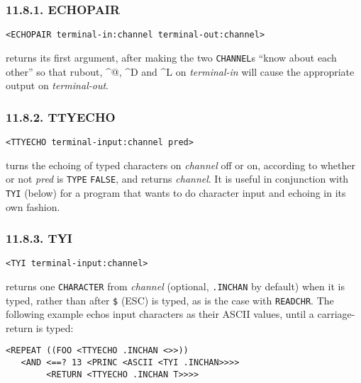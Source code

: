 \documentclass[a4paper,]{article}
\begin{document}
\subsubsection{11.8.1. ECHOPAIR}\label{echopair}

\begin{verbatim}
<ECHOPAIR terminal-in:channel terminal-out:channel>
\end{verbatim}

 returns its first argument, after making the two \texttt{CHANNEL}s ``know about each
other'' so that rubout, \^{}@,  \^{}D  and \^{}L
 on \emph{terminal-in} will cause the appropriate output on \emph{terminal-out}.

\subsubsection{11.8.2. TTYECHO}\label{ttyecho}

\begin{verbatim}
<TTYECHO terminal-input:channel pred>
\end{verbatim}

 turns the echoing of typed characters on \emph{channel} off or on, according to whether or
not \emph{pred} is \texttt{TYPE} \texttt{FALSE}, and returns \emph{channel}. It is useful in conjunction with \texttt{TYI}
(below) for a program that wants to do character input and echoing in its own fashion.

\subsubsection{11.8.3. TYI}\label{tyi}

\begin{verbatim}
<TYI terminal-input:channel>
\end{verbatim}

 returns one \texttt{CHARACTER} from \emph{channel} (optional, \texttt{.INCHAN} by default) when
it is typed, rather than after \texttt{\$} \index{\texttt{\$}} (ESC) is typed, as is the case with
\texttt{READCHR}. The following example echos input characters as their ASCII values, until a
carriage-return is typed:

\begin{verbatim}
<REPEAT ((FOO <TTYECHO .INCHAN <>>))
   <AND <==? 13 <PRINC <ASCII <TYI .INCHAN>>>>
        <RETURN <TTYECHO .INCHAN T>>>>
\end{verbatim}
\end{document}
